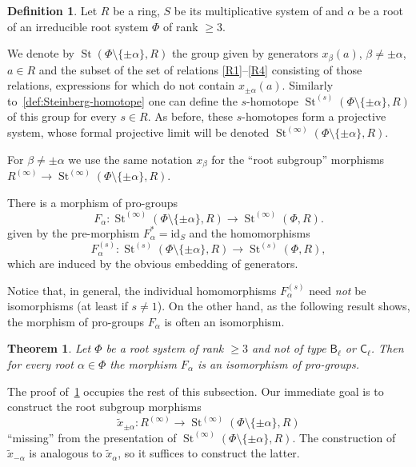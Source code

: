 \documentclass{article}
\numberwithin{equation}{section}
\newtheorem{theorem}{Theorem}
\theoremstyle{definition}
\newtheorem{df}[lemma]{Definition} \Crefname{df}{Definition}{Definitions}
\theoremstyle{remark}
\DeclareMathOperator\St{St}
\DeclareMathOperator{\Pro}{Pro}
\newcommand{\Set}{\mathbf{Set}}
\newcommand{\rB}{\mathsf{B}}
\newcommand{\rC}{\mathsf{C}}
\begin{document}
\begin{df}
Let $R$ be a ring, $S$ be its multiplicative system of and $\alpha$ be a root of an irreducible root system $\Phi$ of rank $\geq 3$. 

We denote by $\St(\Phi\setminus\{\pm \alpha\}, R)$ the group given by generators $x_\beta(a)$, $\beta \neq \pm \alpha$, $a\in R$ and the subset of the set of relations \eqref{R1}--\eqref{R4} consisting of those relations, expressions for which do not contain $x_{\pm\alpha}(a)$.
Similarly to~\cref{def:Steinberg-homotope} one can define the $s$-homotope $\St^{(s)}(\Phi\setminus\{\pm \alpha\}, R)$ of this group for every $s\in R$. 
As before, these $s$-homotopes form a projective system, whose formal projective limit will be denoted $\St^{(\infty)}(\Phi \setminus\{\pm \alpha\}, R)$. 
\end{df}

For $\beta \neq \pm\alpha$ we use the same notation $x_\beta$ for the ``root subgroup'' morphisms $R^{(\infty)}\to \St^{(\infty)}(\Phi \setminus\{\pm\alpha\}, R)$.

There is a morphism of pro-groups
\[ F_\alpha \colon \St^{(\infty)}(\Phi \setminus\{\pm\alpha\}, R) \to \St^{(\infty)}(\Phi, R). \]
given by the pre-morphism $F_\alpha^{*} = \mathrm{id}_S$ and the homomorphisms \[F_\alpha^{(s)} \colon \St^{(s)}(\Phi \setminus\{\pm\alpha\}, R) \to \St^{(s)}(\Phi, R),\] which are induced by the obvious embedding of generators.

Notice that, in general, the individual homomorphisms $F_\alpha^{(s)}$ need {\it not} be isomorphisms (at least if $s \neq 1$). On the other hand, as the following result shows, the morphism of pro-groups $F_\alpha$ is often an isomorphism. 
\begin{theorem}\label{SingleRootElimination}
 Let \(\Phi\) be a root system of rank \(\geq 3\) and not of type \(\rB_\ell\) or \(\rC_\ell\). Then for every root \(\alpha \in \Phi\) the morphism $F_\alpha$ is an isomorphism of pro-groups.
\end{theorem}
The proof of~\cref{SingleRootElimination} occupies the rest of this subsection.
Our immediate goal is to construct the root subgroup morphisms
\[\widetilde x_{\pm \alpha} \colon R^{(\infty)} \to \St^{(\infty)}(\Phi \setminus \{\pm \alpha\}, R) \] ``missing'' from the presentation of $\St^{(\infty)}(\Phi\setminus\{\pm\alpha\}, R)$. The construction of $\widetilde{x}_{-\alpha}$ is analogous to $\widetilde{x}_\alpha$, so it suffices to construct the latter.
 
\end{document}
